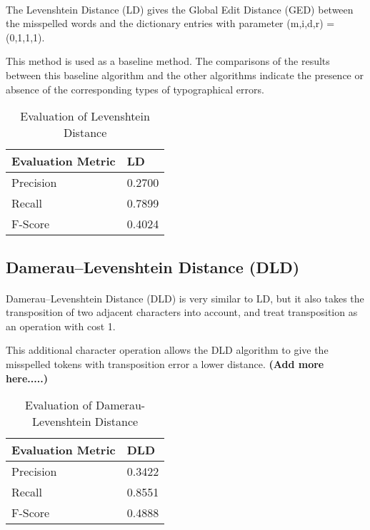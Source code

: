 \documentclass[11pt]{article}
\begin{document}
\paragraph{} The Levenshtein Distance (LD) gives the Global Edit Distance (GED) between the misspelled words and the dictionary entries with parameter (m,i,d,r) = (0,1,1,1). 

This method is used as a baseline method. The comparisons of the results between this baseline algorithm and the other algorithms indicate the presence or absence of the corresponding types of typographical errors.

\begin{table}[h]
 \begin{center}
\begin{tabular}{| l | l |}

      \hline
      Evaluation Metric & LD \\
      \hline\hline
      Precision & 0.2700 \\
      Recall & 0.7899 \\
      F-Score & 0.4024 \\
      \hline

\end{tabular}
\caption{Evaluation of Levenshtein Distance}\label{table2}
 \end{center}
\end{table}


\subsection{Damerau–Levenshtein Distance (DLD)}

\paragraph{} Damerau–Levenshtein Distance (DLD) is very similar to LD, but it also takes the transposition of two adjacent characters into account, and treat transposition as an operation with cost 1.

This additional character operation allows the DLD algorithm to give the misspelled tokens with transposition error a lower distance. \textbf{(Add more here.....)}

\begin{table}[h]
 \begin{center}
\begin{tabular}{| l | l |}

      \hline
      Evaluation Metric & DLD \\
      \hline\hline
      Precision & 0.3422 \\
      Recall & 0.8551 \\
      F-Score & 0.4888 \\
      \hline

\end{tabular}
\caption{Evaluation of Damerau-Levenshtein Distance}\label{table3}
 \end{center}
\end{table}
\end{document}
